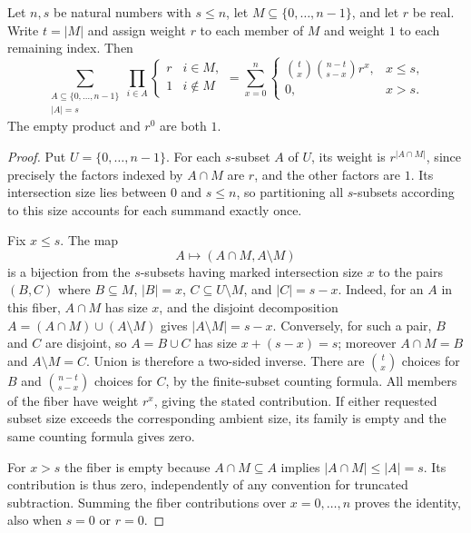 \begin{lemma}
Let $n,s$ be natural numbers with $s\le n$, let $M\subseteq\{0,\ldots,n-1\}$,
and let $r$ be real. Write $t=|M|$ and assign weight $r$ to each member of
$M$ and weight $1$ to each remaining index. Then
\[
 \sum_{\substack{A\subseteq\{0,\ldots,n-1\}\\|A|=s}}
   \prod_{i\in A}\begin{cases}r&i\in M,\\1&i\notin M\end{cases}
 =\sum_{x=0}^n
   \begin{cases}
    \binom{t}{x}\binom{n-t}{s-x}r^x,&x\le s,\\
    0,&x>s.
   \end{cases}
\]
The empty product and $r^0$ are both $1$.
\end{lemma}
\begin{proof}
Put $U=\{0,\ldots,n-1\}$. For each $s$-subset $A$ of $U$, its weight is
$r^{|A\cap M|}$, since precisely the factors indexed by $A\cap M$ are
$r$, and the other factors are $1$. Its intersection size lies between
$0$ and $s\le n$, so partitioning all $s$-subsets according to this size
accounts for each summand exactly once.

Fix $x\le s$. The map
\[
 A\longmapsto (A\cap M,A\setminus M)
\]
is a bijection from the $s$-subsets having marked intersection size $x$
to the pairs $(B,C)$ where $B\subseteq M$, $|B|=x$,
$C\subseteq U\setminus M$, and $|C|=s-x$.
Indeed, for an $A$ in this fiber, $A\cap M$ has size $x$, and the disjoint
decomposition $A=(A\cap M)\cup(A\setminus M)$ gives
$|A\setminus M|=s-x$. Conversely, for such a pair, $B$ and $C$ are
disjoint, so $A=B\cup C$ has size $x+(s-x)=s$; moreover
$A\cap M=B$ and $A\setminus M=C$. Union is therefore a two-sided inverse.
There are $\binom{t}{x}$ choices for $B$ and
$\binom{n-t}{s-x}$ choices for $C$, by the finite-subset counting formula.
All members of the fiber have weight $r^x$, giving the stated contribution.
If either requested subset size exceeds the corresponding ambient size,
its family is empty and the same counting formula gives zero.

For $x>s$ the fiber is empty because $A\cap M\subseteq A$ implies
$|A\cap M|\le |A|=s$. Its contribution is thus zero, independently of
any convention for truncated subtraction. Summing the fiber contributions
over $x=0,\ldots,n$ proves the identity, also when $s=0$ or $r=0$.
\end{proof}
